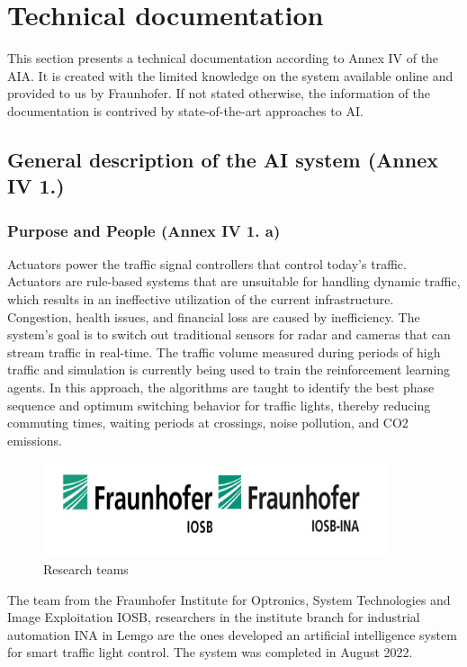\section{Technical documentation}
  This section presents a technical documentation according to Annex IV of the AIA.\@
  It is created with the limited knowledge on the system available online and provided to us by Fraunhofer. If not stated otherwise, 
  the information of the documentation is contrived by state-of-the-art approaches to AI.\@

  \medskip
  
  \subsection{General description of the AI system (Annex IV 1.)}
  \subsubsection{Purpose and People (Annex IV 1. a)}
  Actuators power the traffic signal controllers that control today's traffic. Actuators are rule-based systems that are unsuitable for handling dynamic traffic, which results in an ineffective utilization of the current infrastructure. Congestion, health issues, and financial loss are caused by inefficiency. The system's goal is to switch out traditional sensors for radar and cameras that can stream traffic in real-time. The traffic volume measured during periods of high traffic and simulation is currently being used to train the reinforcement learning agents. In this approach, the algorithms are taught to identify the best phase sequence and optimum switching behavior for traffic lights, thereby reducing commuting times, waiting periods at crossings, noise pollution, and CO2 emissions.
 \begin{figure}[h]
        \centering
        \includegraphics[width=0.9\textwidth]{paper-template/figs/logo.jpg}
        \caption{Research teams}
        \label{fig:my_label}
\end{figure} 
The team from the Fraunhofer Institute for Optronics, System Technologies and Image Exploitation IOSB, researchers in the institute branch for industrial automation INA in Lemgo are the ones developed an artificial intelligence system for smart traffic light control. The system was completed in August 2022.
